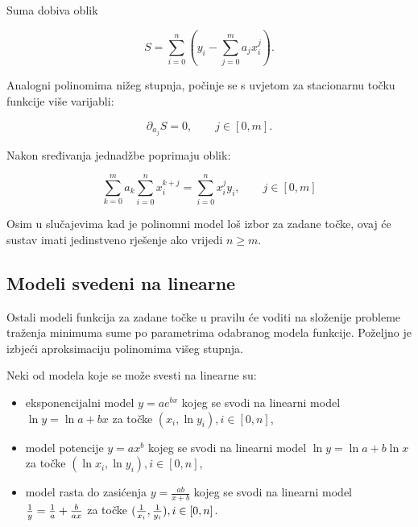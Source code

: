 Suma dobiva oblik

$$
S=\sum_{i=0}^n\left(y_i-\sum_{j=0}^ma_jx_i^j\right).
$$

Analogni polinomima nižeg stupnja, počinje se s uvjetom za stacionarnu točku funkcije više varijabli:

$$
\partial_{a_j}S=0,\qquad j\in[0,m].
$$

Nakon sređivanja jednadžbe poprimaju oblik:

$$
\sum_{k=0}^ma_k\sum_{i=0}^nx_i^{k+j}=\sum_{i=0}^nx_i^jy_i,\qquad j\in[0,m]
$$

Osim u slučajevima kad je polinomni model loš izbor za zadane točke, ovaj će sustav imati jedinstveno rješenje ako vrijedi $n\geq m$.

\subsection{Modeli svedeni na linearne}

Ostali modeli funkcija za zadane točke u pravilu će voditi na složenije probleme traženja minimuma sume po parametrima odabranog modela funkcije. Poželjno je izbjeći aproksimaciju polinomima višeg stupnja.

Neki od modela koje se može svesti na linearne su:

\begin{itemize}
    \item eksponencijalni model $y=ae^{bx}$ kojeg se svodi na linearni model $\ln y = \ln a+bx$ za točke $(x_i,\ln y_i), i\in[0,n]$,
    \item model potencije $y=ax^b$ kojeg se svodi na linearni model $\ln y = \ln a+b\ln x$ za točke $(\ln x_i, \ln y_i), i\in[0,n]$,
    \item model rasta do zasićenja $y=\frac{ab}{x+b}$ kojeg se svodi na linearni model ${1\over y}={1\over a}+{b\over ax}$ za točke $({1\over x_i}, {1\over y_i}), i\in[0,n]$.
\end{itemize}
